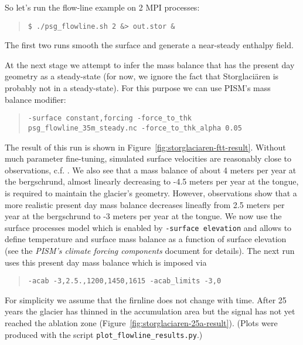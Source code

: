 So let's run the flow-line example on 2 MPI processes:
\begin{quote}\small
\begin{verbatim}
$ ./psg_flowline.sh 2 &> out.stor &
\end{verbatim}
\normalsize\end{quote}

The first two runs smooth the surface and generate a near-steady enthalpy field.

At the next stage we attempt to infer the mass balance that has the present day geometry as a steady-state (for now, we ignore the fact that Storglaci{\"a}ren is probably not in a steady-state).  For this purpose we can use PISM's mass balance modifier:
\begin{quote}\small
\begin{verbatim}
-surface constant,forcing -force_to_thk psg_flowline_35m_steady.nc -force_to_thk_alpha 0.05
\end{verbatim}
\normalsize\end{quote}
The result of this run is shown in Figure~\ref{fig:storglaciaren-ftt-result}. Without much parameter fine-tuning, simulated surface velocities are reasonably close to observations, c.f. \cite{AschwandenBlatter}.  We also see that a mass balance of about 4 meters per year at the bergschrund, almost linearly decreasing to -4.5 meters per year at the tongue, is required to maintain the glacier's geometry.  However, observations show that a more realistic present day mass balance decreases lineafly from 2.5 meters per year at the bergschrund to -3 meters per year at the tongue.  We now use the surface processes model which is enabled by \texttt{-surface elevation} and allows to define temperature and surface mass balance as a function of surface elevation (see the \emph{PISM's climate forcing components} document for details).  The next run uses this present day mass balance which is imposed via 
\begin{quote}\small
\begin{verbatim}
-acab -3,2.5.,1200,1450,1615 -acab_limits -3,0
\end{verbatim}
\normalsize\end{quote} 
For simplicity we assume that the firnline does not change with time. After 25 years the glacier has thinned in the accumulation area but the signal has not yet reached the ablation zone (Figure~\ref{fig:storglaciaren-25a-result}). (Plots were produced with the script \texttt{plot_flowline_results.py}.)

